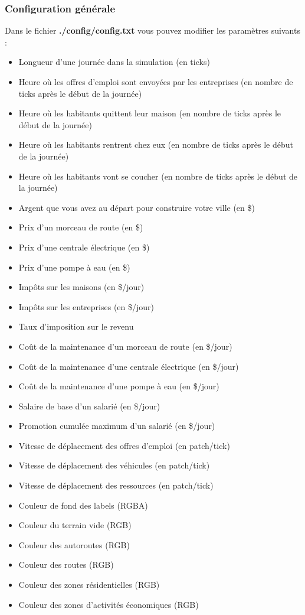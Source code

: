 \documentclass[11pt]{report}
\begin{document}
\subsubsection{Configuration générale}
Dans le fichier \textbf{./config/config.txt} vous pouvez modifier les paramètres suivants :
\begin{itemize}
	\item Longueur d'une journée dans la simulation (en ticks)
	\item Heure où les offres d'emploi sont envoyées par les entreprises (en nombre de ticks après le début de la journée)
	\item Heure où les habitants quittent leur maison (en nombre de ticks après le début de la journée)
	\item Heure où les habitants rentrent chez eux (en nombre de ticks après le début de la journée)
	\item Heure où les habitants vont se coucher (en nombre de ticks après le début de la journée)
	\item Argent que vous avez au départ pour construire votre ville (en \$)
	\item Prix d'un morceau de route (en \$)
	\item Prix d'une centrale électrique (en \$)
	\item Prix d'une pompe à eau (en \$)
	\item Impôts sur les maisons (en \$/jour)
	\item Impôts sur les entreprises (en \$/jour)
	\item Taux d'imposition sur le revenu
	\item Coût de la maintenance d'un morceau de route (en \$/jour)
	\item Coût de la maintenance d'une centrale électrique (en \$/jour)
	\item Coût de la maintenance d'une pompe à eau (en \$/jour)
	\item Salaire de base d'un salarié (en \$/jour)
	\item Promotion cumulée maximum d'un salarié (en \$/jour)
	\item Vitesse de déplacement des offres d'emploi (en patch/tick)
	\item Vitesse de déplacement des véhicules (en patch/tick)
	\item Vitesse de déplacement des ressources (en patch/tick)
	\item Couleur de fond des labels (RGBA)
	\item Couleur du terrain vide (RGB)
	\item Couleur des autoroutes (RGB)
	\item Couleur des routes (RGB)
	\item Couleur des zones résidentielles (RGB)
	\item Couleur des zones d'activités économiques (RGB)
\end{itemize}
\end{document}
